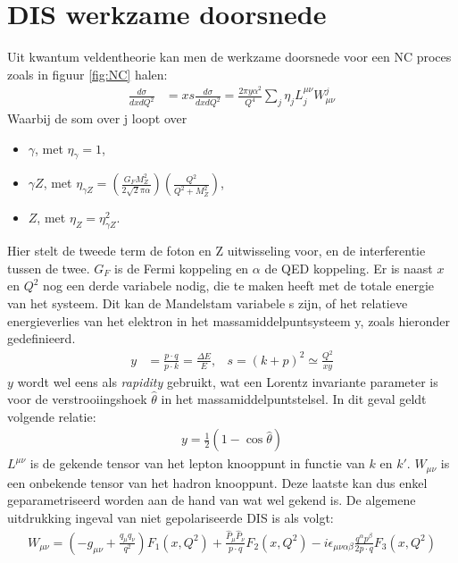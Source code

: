 \documentclass[a4paper,11pt]{article}
\numberwithin{equation}{section} %
\begin{document}
\section{DIS werkzame doorsnede} \label{app:SF}
Uit kwantum veldentheorie kan men de werkzame doorsnede voor een NC proces zoals in figuur \ref{fig:NC} halen:
\begin{align}
\frac{d\sigma}{dxdQ^2} &= xs \frac{d\sigma}{dxdQ^2} = \frac{2\pi y \alpha^2}{Q^4} \sum_j \eta_j L_j^{\mu \nu} W_{\mu \nu}^j
\end{align}
Waarbij de som over j loopt over
\begin{itemize}
  \item $\gamma$, met $\eta_\gamma=1$,
  \item $\gamma Z$, met $\eta_{\gamma Z} = \left( \frac{G_F M_Z^2}{2\sqrt{2}\pi \alpha} \right) \left(\frac{Q^2}{Q^2+M_Z^2} \right)$,
  \item $Z$, met $\eta_Z = \eta_{\gamma Z}^2$.
\end{itemize}
Hier stelt de tweede term de foton en Z uitwisseling voor, en de interferentie tussen de twee. $G_F$ is de Fermi koppeling en $\alpha$ de QED koppeling.
Er is naast $x$ en $Q^2$ nog een derde variabele nodig, die te maken heeft met de totale energie van het systeem.
Dit kan de Mandelstam variabele s zijn, of het relatieve energieverlies van het elektron in het massamiddelpuntsysteem y, zoals hieronder gedefinieerd.
\begin{align}
y &= \frac{p \cdot q}{p \cdot k} = \frac{\Delta E}{E} ,& s = (k+p)^2 \simeq \frac{Q^2}{xy}
\end{align}
$y$ wordt wel eens als \textit{rapidity} gebruikt, wat een Lorentz invariante parameter is voor de verstrooiingshoek $\hat{\theta}$ in het massamiddelpuntstelsel.
In dit geval geldt volgende relatie:
\begin{align}
y = \frac{1}{2} \left( 1-\cos{\hat{\theta}} \right)
\end{align}
$L^{\mu \nu}$ is de gekende tensor van het lepton knooppunt in functie van $k$ en $k'$.
$W_{\mu \nu}$ is een onbekende tensor van het hadron knooppunt.
Deze laatste kan dus enkel geparametriseerd worden aan de hand van wat wel gekend is.
De algemene uitdrukking ingeval van niet gepolariseerde DIS is als volgt:
\begin{align}
W_{\mu \nu} = \left( -g_{\mu \nu} + \frac{q_\mu q_\nu}{q^2} \right) F_1(x,Q^2) + \frac{\hat{P}_\mu \hat{P}_\nu}{p \cdot q} F_2(x,Q^2) -  i\epsilon_{\mu \nu \alpha \beta} \frac{q^\alpha p^\beta}{2p \cdot q} F_3(x,Q^2)
\end{align}
\end{document}
